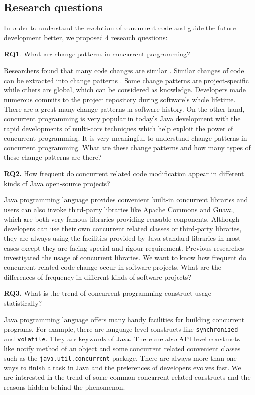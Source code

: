 \documentclass[conference]{IEEEtran}
\begin{document}
\subsection{Research questions}
In order to understand the evolution of concurrent code and guide the future development better, we proposed 4 research questions:

\textbf{RQ1.} What are change patterns in concurrent programming?

Researchers found that many code changes are similar \cite{conf/icse/KimN09}. Similar changes of code can be extracted into change patterns \cite{conf/icsm/MartinezDM13}. Some change patterns are project-specific while others are global, which can be considered as knowledge. Developers made numerous commits to the project repository during software's whole lifetime. There are a great many change patterns in software history. On the other hand, concurrent programming is very popular in today's Java development with the rapid developments of multi-core techniques which help exploit the power of concurrent programming. It is very meaningful to understand change patterns in concurrent programming. What are these change patterns and how many types of these change patterns are there?

\textbf{RQ2.} How frequent do concurrent related code modification appear in different kinds of Java open-source projects?

Java programming language provides convenient built-in concurrent libraries and users can also invoke third-party libraries like Apache Commons and Guava, which are both very famous libraries providing reusable conponents. Although developers can use their own concurrent related classes or third-party libraries, they are always using the facilities provided by Java standard libraries in most cases except they are facing special and rigour requirement. Previous researches \cite{journals/jss/PintoTFFB15, journals/infsof/WuCZX16, conf/sigsoft/OkurD12} investigated the usage of concurrent libraries. We want to know how frequent do concurrent related code change occur in software projects. What are the differences of frequency in different kinds of software projects?

\textbf{RQ3.} What is the trend of concurrent programming construct usage statistically?

Java programming language offers many handy facilities for building concurrent programs. For example, there are language level constructs like \texttt{synchronized} and \texttt{volatile}. They are keywords of Java. There are also API level constructs like notify method of an object and some concurrent related convenient classes such as the \texttt{java.util.concurrent} package. There are always more than one ways to finish a task in Java and the preferences of developers evolves fast. We are interested in the trend of some common concurrent related constructs and the reasons hidden behind the phenomenon.
\end{document}
